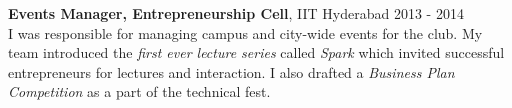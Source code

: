 \documentclass[margin,line]{res}
\begin{document}
\begin{resume}
  \vspace*{-2.5mm}

  {\bf Events Manager, Entrepreneurship Cell}, IIT Hyderabad \hfill 2013 - 2014 \\
    I was responsible for managing campus and city-wide events for the club. My team introduced the {\em first ever lecture series} called {\it Spark} which invited successful entrepreneurs for lectures and interaction. I also drafted a {\it Business Plan Competition} as a part of the technical fest.

\begin{comment}
\section{\sc References}

  \begin{tabular}{@{}p{1.85in}p{2in}p{2in}}

  {\bf Dr. Vineeth N \newline Balasubramanian } & {\bf Dr. Ramakrishna \newline Upadrasta} & {\bf Joerg Schad} \\
        {\it Assistant Professor} & {\it Assistant Professor} & {\it Distributed Systems Engineer} \\
        {\it IIT Hyderabad} & {\it IIT Hyderabad} & {\it Mesosphere Inc} \\
        {\it Hyderabad, India} & {\it Hyderabad, India} & {\it Hamburg, Germany} \\
        {\it vineethnb@iith.ac.in} & {\it ramakrishna@iith.ac.in} & {\it joerg@mesosphere.io} \\

  \end{tabular}
\end{comment}

\end{resume}
\end{document}
